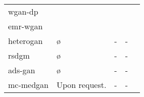 \begin{table}[H]
\begin{tabularx}{\textwidth}{@{}XXXp{2cm}p{2cm}@{}}
        \citeauthor{chincheong2020generation} \gls{wgan-dp}
        & &
        &\\
        
        \citeauthor{Zhang2020} \gls{emr-wgan}
        & &
        &\\
         
        \citeauthor{yan2020generating} \gls{heterogan} 
        & \o & - 
        & -\\
        
        \citeauthor{ozyigit2020generation} \gls{rsdgm} 
        & \o & - 
        & -\\
        
        \citeauthor{Yoon2020-anon} \gls{ads-gan} 
        & \o & - 
        & - \\
        
        \citeauthor{Goncalves2020} \gls{mc-medgan} 
        & Upon request. & - 
        & -\\
        \bottomrule
    \end{tabularx}
\end{table}